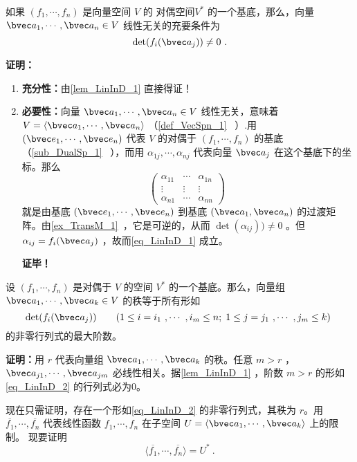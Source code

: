 \begin{lemma}{}\label{lem_LinInD_2}
如果 $(f_1,\cdots,f_n)$ 是向量空间 $V$ 的 对偶空间$V^*$ 的一个基底，那么，向量 $\bvec a_1,\cdots,\bvec a_n\in V$ 线性无关的充要条件为
\begin{equation}\label{eq_LinInD_1}
\det(f_i(\bvec a_j))\neq 0~.
\end{equation}
\end{lemma}
\textbf{证明：} \begin{enumerate}
\item \textbf{充分性：}由\autoref{lem_LinInD_1} 直接得证！
\item \textbf{必要性：}向量 $\bvec a_1,\cdots,\bvec a_n\in V$ 线性无关，意味着 $V=\langle\bvec a_1,\cdots,\bvec a_n\rangle$ （\autoref{def_VecSpn_1}~ ）.用 $(\bvec e_1,\cdots,\bvec e_n)$ 代表 $V$ 的对偶于 $(f_1,\cdots,f_n)$ 的基底（\autoref{sub_DualSp_1}~ ），而用 $\alpha_{1j},\cdots,\alpha_{nj}$ 代表向量 $\bvec a_j$ 在这个基底下的坐标。那么
\begin{equation}
\begin{pmatrix}
\alpha_{11}&\cdots&\alpha_{1n}\\
\vdots&\vdots&\vdots\\
\alpha_{n1}&\cdots&\alpha_{nn}
\end{pmatrix}~
\end{equation}
就是由基底 $(\bvec e_1,\cdots,\bvec e_n)$ 到基底 $(\bvec a_1,\bvec a_n)$ 的过渡矩阵。由\autoref{ex_TransM_1}~，它是可逆的，从而 $\det(\alpha_{ij}))\neq0$ 。但 $\alpha_{ij}=f_i(\bvec a_j)$ ，故而\autoref{eq_LinInD_1} 成立。

\textbf{证毕！} 
\end{enumerate}
\begin{theorem}{}
设 $(f_1,\cdots,f_n)$ 是对偶于 $V$ 的空间 $V^*$ 的一个基底。那么，向量组 $\bvec a_1,\cdots,\bvec a_k\in V$ 的秩等于所有形如
\begin{equation}\label{eq_LinInD_2}
\det(f_i(\bvec a_j))\qquad (1\leq i=i_1~,\cdots~ ,i_m\leq n;\;1\leq j=j_1~,\cdots~,j_m\leq k)~
\end{equation}
的非零行列式的最大阶数。
\end{theorem}
\textbf{证明：}用 $r$ 代表向量组 $\bvec a_1,\cdots,\bvec a_k$ 的秩。任意 $m>r$ ，$\bvec a_{j1},\cdots,\bvec a_{jm}$ 必线性相关。据\autoref{lem_LinInD_1} ，阶数 $m>r$ 的形如\autoref{eq_LinInD_2} 的行列式必为0。

现在只需证明，存在一个形如\autoref{eq_LinInD_2} 的非零行列式，其秩为 $r$。用 $\overline{f_1},\cdots,\overline{f_n}$ 代表线性函数 $f_1,\cdots,f_n$ 在子空间 $U=\langle\bvec a_1,\cdots,\bvec a_k\rangle$ 上的限制。
现要证明
\begin{equation}\label{eq_LinInD_3}
\langle\overline{f_1},\cdots,\overline{f_n}\rangle=U^*~.
\end{equation}

